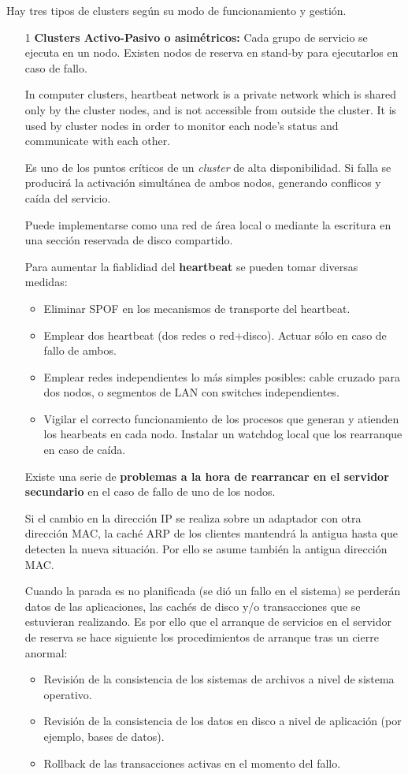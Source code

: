 \documentclass{apuntes}[nochap]
\newcounter{problem}
\begin{document}
Hay tres tipos de clusters según su modo de funcionamiento y gestión.
\begin{enumerate}
\item[1] \textbf{Clusters Activo-Pasivo o asimétricos:} Cada grupo de servicio se ejecuta en un nodo. Existen nodos de reserva en stand-by para ejecutarlos en caso de fallo.

\begin{defn}[Heartbeat]
In computer clusters, heartbeat network is a private network which is shared only by the cluster nodes, and is not accessible from outside the cluster. It is used by cluster nodes in order to monitor each node's status and communicate with each other.

Es uno de los puntos críticos de un \textit{cluster} de alta disponibilidad. Si falla se producirá la activación simultánea de ambos nodos, generando conflicos y caída del servicio.

Puede implementarse como una red de área local o mediante la escritura en una sección reservada de disco compartido.
\end{defn}

Para aumentar la fiablidiad del \textbf{heartbeat} se pueden tomar diversas medidas:
\begin{itemize}
\item Eliminar SPOF en los mecanismos de transporte del heartbeat.
\item Emplear dos heartbeat (dos redes o red+disco). Actuar sólo en caso de fallo
de ambos.
\item Emplear redes independientes lo más simples posibles: cable cruzado para
dos nodos, o segmentos de LAN con switches independientes.
\item Vigilar el correcto funcionamiento de los procesos que generan y atienden los
hearbeats en cada nodo. Instalar un watchdog local que los rearranque en caso de caída.
\end{itemize}

Existe una serie de \textbf{problemas a la hora de rearrancar en el servidor secundario} en el caso de fallo de uno de los nodos.

Si el cambio en la dirección IP se realiza sobre un adaptador con otra dirección MAC, la caché ARP de los clientes mantendrá la antigua hasta que detecten la nueva situación. Por ello se asume también la antigua dirección MAC.

Cuando la parada es no planificada (se dió un fallo en el sistema) se perderán datos de las aplicaciones, las cachés de disco y/o transacciones que se estuvieran realizando. Es por ello que el arranque de servicios en el servidor de reserva se hace siguiente los procedimientos de arranque tras un cierre anormal:
\begin{itemize}
\item Revisión de la consistencia de los sistemas de archivos a nivel de sistema operativo.
\item Revisión de la consistencia de los datos en disco a nivel de aplicación (por ejemplo, bases de datos).
\item Rollback de las transacciones activas en el momento del fallo.
\end{itemize}


\end{enumerate}
\end{document}
